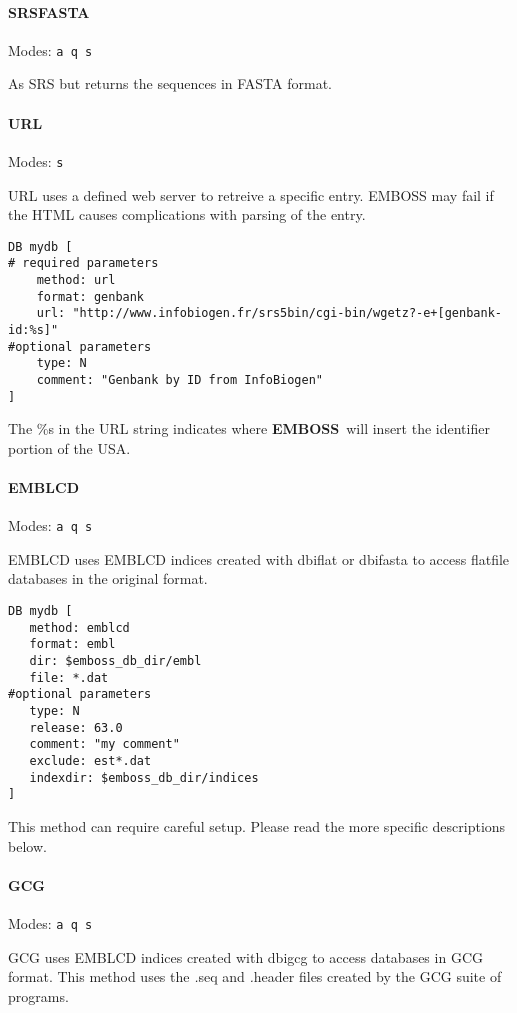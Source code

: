 \documentclass{report}
\newcommand{\ilcomm}[1]{{\tt #1}}
\newcommand{\filename}[1]{{\sf\textsl #1}}
\newcommand{\progname}[1]{{\sc #1}}
\newcommand{\EMBOSS}{{\sf\bfseries EMBOSS}}
\begin{document}
\paragraph{SRSFASTA}\par\noindent
Modes: \ilcomm{a q s}\par\noindent
As SRS but returns the sequences in FASTA format.\\

\paragraph{URL}\par\noindent
Modes: \ilcomm{s}\par\noindent
URL uses a defined web server to retreive a specific entry. EMBOSS may fail if the HTML causes complications with parsing of the entry. 

\begin{verbatim}
DB mydb [
# required parameters
    method: url
    format: genbank
    url: "http://www.infobiogen.fr/srs5bin/cgi-bin/wgetz?-e+[genbank-id:%s]"
#optional parameters
    type: N
    comment: "Genbank by ID from InfoBiogen"
]
\end{verbatim}
The \%s in the URL string indicates where \EMBOSS\ will insert the identifier portion of the USA.

\paragraph{EMBLCD}\par\noindent
Modes: \ilcomm{a q s}\par\noindent
EMBLCD uses EMBLCD indices created with \progname{dbiflat} or \progname{dbifasta} to access flatfile databases in the original format.

\begin{verbatim}
DB mydb [
   method: emblcd
   format: embl
   dir: $emboss_db_dir/embl
   file: *.dat
#optional parameters
   type: N
   release: 63.0
   comment: "my comment"
   exclude: est*.dat
   indexdir: $emboss_db_dir/indices
]
\end{verbatim}
This method can require careful setup. Please read the more specific descriptions below.

\paragraph{GCG}\par\noindent
Modes: \ilcomm{a q s}\par\noindent
GCG uses EMBLCD indices created with \progname{dbigcg} to access databases in GCG format. This method uses the \filename{.seq} and \filename{.header} files created by the \progname{GCG} suite of programs.
\end{document}
